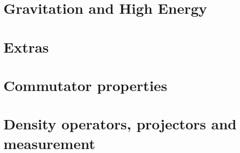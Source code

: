 \documentclass{book}
\begin{document}
\chapter{Gravitation and High Energy}



\chapter{Extras}


\appendix
\chapter{Commutator properties}

\chapter{Density operators, projectors and measurement}


\printbibliography[title=References]
\end{document}
